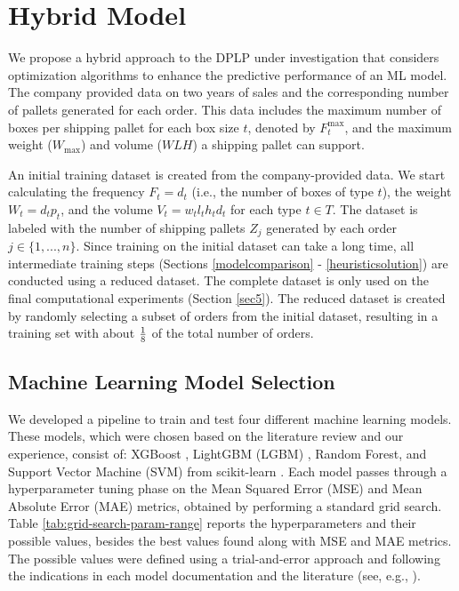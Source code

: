 \documentclass[runningheads]{llncs}
\newcommand{\rev}[1]{{#1}}
\begin{document}
\section{Hybrid Model \label{sec4}}

We propose a hybrid approach to the DPLP under investigation that considers optimization algorithms to enhance the predictive performance of an ML model. The company provided data on two years of sales and the corresponding number of pallets generated for each order. This data includes the maximum number of boxes per shipping pallet for each box \rev{size $t$, denoted by $F_t^{\max}$, and the maximum weight ($W_{\max}$) and volume ($WLH$) a shipping pallet can support.}

An initial training dataset is created from the company-provided data. We start calculating the frequency $F_{t} = d_{t} $ (i.e., the number of boxes of type $t$), the weight $W_{t} = d_{t}p_{t}$, and the volume $V_{t} = w_{t}l_{t}h_{t}d_{t}$ for each type \( t \in T \). The dataset is labeled with the number of shipping pallets $Z_j$ generated by each order $j \in \{1,...,n\}$. 
Since training on the initial dataset can take a long time, all intermediate training steps (\rev{Sections \ref{modelcomparison} - \ref{heuristicsolution}}) are conducted using a reduced dataset. The complete dataset \rev{is only used on the final computational experiments (Section \ref{sec5}).} The reduced dataset is created by randomly selecting a subset of orders from the initial dataset, resulting in a training set with about $1\over8$ of the total number of orders. 

\subsection{Machine Learning Model Selection \label{modelcomparison}} 

We developed a pipeline to train and test four different machine learning models. These models, which were chosen based on the literature review and our experience, consist of: XGBoost \cite{xgboost}, LightGBM (LGBM) \cite{lightgbm}, Random Forest, and Support Vector Machine (SVM) from scikit-learn \cite{scikitlearn}. Each model passes through a hyperparameter tuning phase on the Mean Squared Error (MSE) and Mean Absolute Error (MAE) metrics, obtained by performing a standard grid search. Table \ref{tab:grid-search-param-range} reports the hyperparameters and their possible values, besides the best values found along with MSE and MAE metrics. The possible values were defined using a trial-and-error approach and following the indications in each model documentation and the literature (see, e.g., \cite{kaggle-xgbost-tuning}). 
\end{document}
